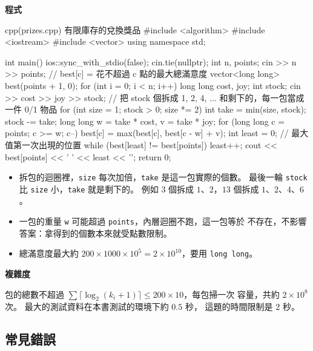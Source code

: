 \textbf{程式}

\begin{example}[label=ex:prizes]{cpp}{(prizes.cpp) 有限庫存的兌換獎品}
#include <algorithm>
#include <iostream>
#include <vector>
using namespace std;

int main() {
    ios::sync_with_stdio(false);
    cin.tie(nullptr);
    int n, points;
    cin >> n >> points;
    // best[c] = 花不超過 c 點的最大總滿意度
    vector<long long> best(points + 1, 0);
    for (int i = 0; i < n; i++) {
        long long cost, joy;
        int stock;
        cin >> cost >> joy >> stock;
        // 把 stock 個拆成 1, 2, 4, ... 和剩下的，每一包當成一件 0/1 物品
        for (int size = 1; stock > 0; size *= 2) {
            int take = min(size, stock);
            stock -= take;
            long long w = take * cost, v = take * joy;
            for (long long c = points; c >= w; c--) {
                best[c] = max(best[c], best[c - w] + v);
            }
        }
    }
    int least = 0;                          // 最大值第一次出現的位置
    while (best[least] != best[points]) {
        least++;
    }
    cout << best[points] << ' ' << least << '\n';
    return 0;
}
\end{example}


\begin{itemize}
\item 拆包的迴圈裡，\texttt{size} 每次加倍，\texttt{take} 是這一包實際的個數。
最後一輪 \texttt{stock} 比 \texttt{size} 小，\texttt{take} 就是剩下的。 例如
$3$ 個拆成 $1$、$2$，$13$ 個拆成 $1$、$2$、$4$、$6$。
\item 一包的重量 \texttt{w} 可能超過 \texttt{points}，內層迴圈不跑，這一包等於
不存在，不影響答案：拿得到的個數本來就受點數限制。
\item 總滿意度最大約 $200 \times 1000 \times 10^5 = 2 \times 10^{10}$，要用
\texttt{long long}。
\end{itemize}

\textbf{複雜度}

包的總數不超過 $\sum \lceil \log_2(k_i + 1) \rceil \le 200 \times 10$，每包掃一次
容量，共約 $2 \times 10^8$ 次。 最大的測試資料在本書測試的環境下約 $0.5$ 秒，
這題的時間限制是 $2$ 秒。

\subsection{常見錯誤}

